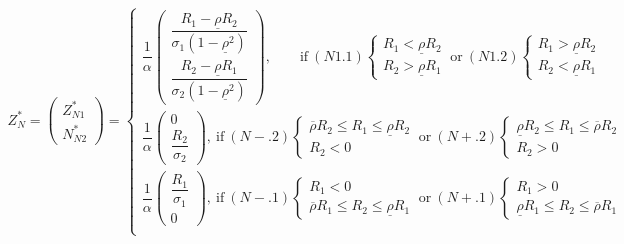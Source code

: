 \documentclass[10pt]{article}
\begin{document}
{\small \begin{eqnarray}
Z_N^* = \left( \begin{matrix} Z_{N 1}^* \\ N_{N 2}^* \end{matrix} \right) = \left\{ \begin{matrix}
\dfrac1{\alpha} \left( \begin{matrix} \dfrac{R_1 - \underline{\rho} R_2}{\sigma_1 (1 - \underline{\rho}^2)} \\ \dfrac{R_2 - \underline{\rho} R_1}{\sigma_2 (1 - \underline{\rho}^2)} \end{matrix} \right), \qquad \text{if} \ (N1.1) \left\{ \begin{matrix} R_1 < \underline{\rho} R_2 \\ R_2 > \underline{\rho} R_1 \end{matrix} \right. \ \text{or} \ (N1.2) \left\{ \begin{matrix} R_1 > \underline{\rho} R_2 \\ R_2 < \underline{\rho} R_1 \end{matrix} \right. \\
\dfrac1{\alpha} \left( \begin{matrix} 0 \\ \dfrac{R_2}{\sigma_2} \end{matrix} \right), \ \text{if} \ (N-.2) \left\{ \begin{matrix} \overline{\rho} R_2 \leqslant R_1 \leqslant \underline{\rho} R_2 \\ R_2 < 0 \end{matrix} \right. \ \text{or} \ (N+.2) \left\{ \begin{matrix} \underline{\rho} R_2 \leqslant R_1 \leqslant \overline{\rho} R_2 \\ R_2 > 0 \end{matrix} \right. \\
\dfrac1{\alpha} \left( \begin{matrix} \dfrac{R_1}{\sigma_1} \\ 0 \end{matrix} \right), \ \text{if} \ (N-.1) \left\{ \begin{matrix} R_1 < 0 \\ \overline{\rho} R_1 \leqslant R_2 \leqslant \underline{\rho} R_1 \end{matrix} \right. \ \text{or} \ (N+.1) \left\{ \begin{matrix} R_1 > 0 \\ \underline{\rho} R_1 \leqslant R_2 \leqslant \overline{\rho} R_1 \end{matrix} \right. \\

\end{matrix}
\end{eqnarray}}
\end{document}
